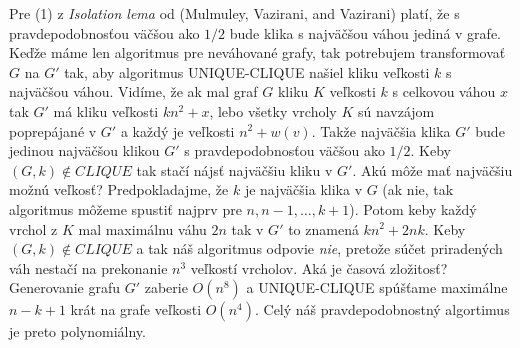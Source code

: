 \documentclass[12pt,a4paper]{article}
\begin{document}
Pre (1) z \emph{Isolation lema} od (Mulmuley, Vazirani, and Vazirani) platí, že s pravdepodobnosťou väčšou ako $1/2$ bude klika s najväčšou váhou jediná v grafe. Keďže máme len algoritmus pre neváhované grafy, tak potrebujem transformovať $G$ na $G'$ tak, aby algoritmus UNIQUE-CLIQUE našiel kliku veľkosti $k$ s najväčšou váhou. Vidíme, že ak mal graf $G$ kliku $K$ veľkosti $k$ s celkovou váhou $x$ tak $G'$ má kliku veľkosti $kn^2 + x$, lebo všetky vrcholy $K$ sú navzájom poprepájané v $G'$ a každý je veľkosti $n^2 + w(v)$. Takže najväčšia klika $G'$ bude jedinou najväčšou klikou $G'$ s pravdepodobnosťou väčšou ako $1/2$. 
Keby $(G,k) \notin CLIQUE$ tak stačí nájsť najväčšiu kliku v $G'$. Akú môže mať najväčšiu možnú veľkosť? Predpokladajme, že $k$ je najväčšia klika v $G$ (ak nie, tak algoritmus môžeme spustiť najprv pre $n, n-1, \ldots, k+1$). Potom keby každý vrchol z $K$ mal maximálnu váhu $2n$ tak v $G'$ to znamená $kn^2 + 2nk$. 
Keby $(G,k) \notin CLIQUE$ a tak náš algoritmus odpovie \emph{nie}, pretože súčet priradených váh nestačí na prekonanie $n^3$ veľkostí vrcholov. 
Aká je časová zložitosť? Generovanie grafu $G'$ zaberie $O(n^8)$ a UNIQUE-CLIQUE spúšťame maximálne $n-k+1$ krát na grafe veľkosti $O(n^4)$. Celý náš pravdepodobnostný algortimus je preto polynomiálny.  
\end{document}
